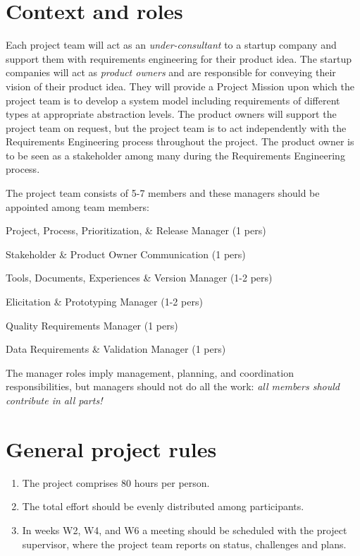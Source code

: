 \documentclass[10pt,a4paper]{article}
\begin{document}
\section{Context and roles}

\noindent Each project team will act as an \textit{under-consultant} to a startup company and support them with requirements engineering for their product idea. The startup companies will act as \textit{product owners} and are responsible for conveying their vision of their product idea. They will provide a Project Mission upon which the project team is to develop a system model including requirements of different types at appropriate abstraction levels. The product owners will support the project team on request, but the project team is to act independently with the Requirements Engineering process throughout the project. The product owner is to be seen as a stakeholder among many during the Requirements Engineering process.
\newline

\noindent The project team consists of 5-7 members and these managers should be appointed among team members:

\begin{description}[noitemsep]
\item[P3RM] Project, Process, Prioritization, \& Release Manager (1 pers)
\item[SPOC] Stakeholder \& Product Owner Communication (1 pers)
\item[TDEVM] Tools, Documents, Experiences \& Version Manager (1-2 pers)
\item[EPM] Elicitation \& Prototyping Manager (1-2 pers)
\item[QRM] Quality Requirements Manager (1 pers)
\item[DRVM] Data Requirements \& Validation Manager (1 pers)
\end{description}

\noindent The manager roles imply management, planning, and coordination responsibilities, but managers should not do all the work: {\it all members should contribute in all parts!}


\section{General project rules}
\begin{enumerate}[noitemsep]
\item The project comprises 80 hours per person.
\item The total effort should be evenly distributed among participants.
\item In weeks W2, W4, and W6 a meeting should be scheduled with the project supervisor, where the project team reports on status, challenges and plans.
\end{enumerate}
\end{document}
